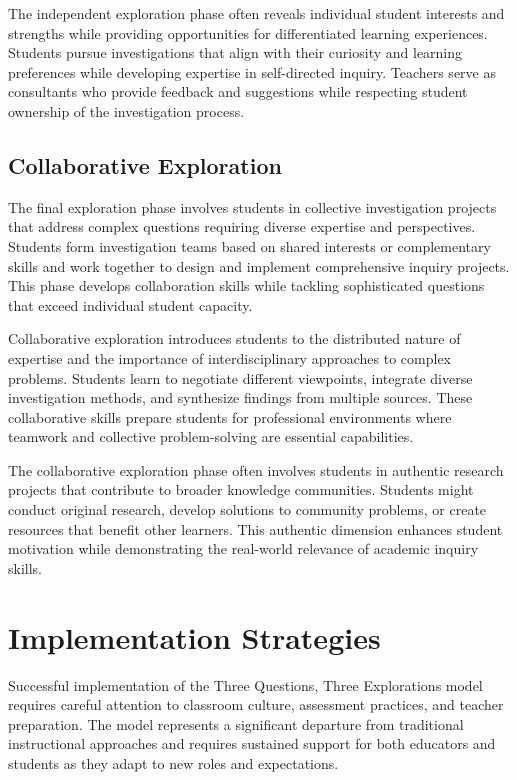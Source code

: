 \documentclass[
  Letterpaper,
]{scrbook}
\begin{document}
The independent exploration phase often reveals individual student
interests and strengths while providing opportunities for differentiated
learning experiences. Students pursue investigations that align with
their curiosity and learning preferences while developing expertise in
self-directed inquiry. Teachers serve as consultants who provide
feedback and suggestions while respecting student ownership of the
investigation process.

\subsection{Collaborative Exploration}\label{collaborative-exploration}

The final exploration phase involves students in collective
investigation projects that address complex questions requiring diverse
expertise and perspectives. Students form investigation teams based on
shared interests or complementary skills and work together to design and
implement comprehensive inquiry projects. This phase develops
collaboration skills while tackling sophisticated questions that exceed
individual student capacity.

Collaborative exploration introduces students to the distributed nature
of expertise and the importance of interdisciplinary approaches to
complex problems. Students learn to negotiate different viewpoints,
integrate diverse investigation methods, and synthesize findings from
multiple sources. These collaborative skills prepare students for
professional environments where teamwork and collective problem-solving
are essential capabilities.

The collaborative exploration phase often involves students in authentic
research projects that contribute to broader knowledge communities.
Students might conduct original research, develop solutions to community
problems, or create resources that benefit other learners. This
authentic dimension enhances student motivation while demonstrating the
real-world relevance of academic inquiry skills.

\section{Implementation Strategies}\label{implementation-strategies}

Successful implementation of the Three Questions, Three Explorations
model requires careful attention to classroom culture, assessment
practices, and teacher preparation. The model represents a significant
departure from traditional instructional approaches and requires
sustained support for both educators and students as they adapt to new
roles and expectations.
\end{document}
